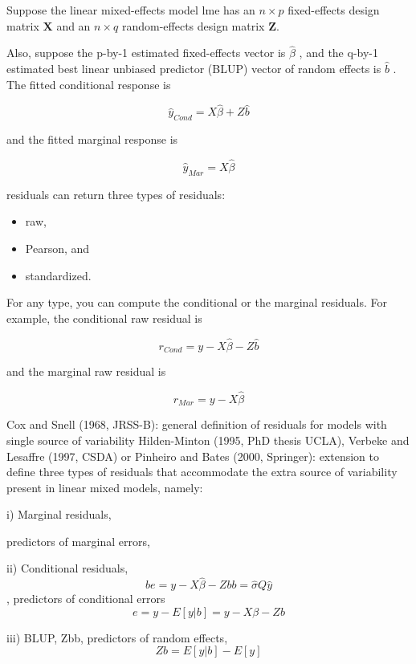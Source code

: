 \documentclass[main.tex]{subfiles}
\begin{document}
Suppose the linear mixed-effects model lme has an $n \times p$ fixed-effects design matrix $\boldsymbol{X}$ and an $n \times q$ random-effects design matrix $\boldsymbol{Z}$. 

Also, suppose the p-by-1 estimated fixed-effects vector is $\hat{\beta}$ , and the q-by-1 estimated best linear unbiased predictor (BLUP) 
vector of random effects is $\hat{b}$ . The fitted conditional response is

\[ \hat{y}_{Cond} = X \hat{\beta} + Z \hat{b} \]

and the fitted marginal response is


\[ \hat{y}_{Mar} = X \hat{\beta} \]

residuals can return three types of residuals:
\begin{itemize} 
\item raw, 
\item Pearson, and 
\item standardized.\end{itemize} For any type, you can compute the conditional or the marginal residuals. For example, the conditional raw residual is


\[ r_{Cond} = y - X \hat{\beta} - Z \hat{b} \]

and the marginal raw residual is



\[ r_{Mar} = y - X \hat{\beta} \]

\newpage

Cox and Snell (1968, JRSS-B): general definition of residuals for
models with single source of variability
Hilden-Minton (1995, PhD thesis UCLA), Verbeke and Lesaffre
(1997, CSDA) or Pinheiro and Bates (2000, Springer): extension to
define three types of residuals that accommodate the extra source of
variability present in linear mixed models, namely:

i) Marginal residuals, 

predictors of marginal errors, 


ii) Conditional residuals, 
\[be = y − X\hat{\beta} − Zbb = \hat{\sigma}Q\hat{y}\] , predictors of
conditional errors 
\[e = y − E[y|b] = y − X\beta − Zb\]

iii) BLUP, Zbb, predictors of random effects,
\[ Zb = E[y|b] − E[y]\]
\end{document}
